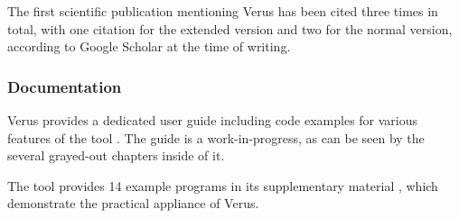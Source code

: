 The first scientific publication mentioning Verus \cite{lattuadaVerusVerifyingRust2023} has been cited three times in total, with one citation for the extended version and two for the normal version, according to Google Scholar at the time of writing.

\subsubsection{Documentation}
Verus provides a dedicated user guide including code examples for various features of the tool \cite{verus-lang_verus_2023}. The guide is a work-in-progress, as can be seen by the several grayed-out chapters inside of it. 

The tool provides 14 example programs in its supplementary material \cite{lattuada_verus_2023}, which demonstrate the practical appliance of Verus. 
